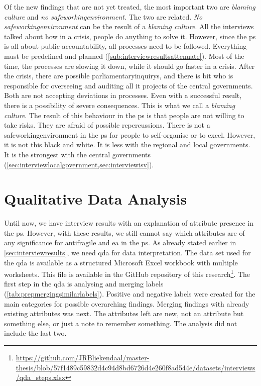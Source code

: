 Of the new findings that are not yet treated, the most important two are \textit{blaming culture} and \textit{no \gls{safeworkingenvironment}}. The two are related. \textit{No \gls{safeworkingenvironment}} can be the result of a \textit{blaming culture}. All the interviews talked about how in a crisis, people do anything to solve it. However, since the \gls{ps} is all about public accountability, all processes need to be followed. Everything must be predefined and planned (\cref{sub:interviewresultsattenuate}). Most of the time, the processes are slowing it down, while it should go faster in a crisis. After the crisis, there are possible \glspl{parliamentaryinquiry}, and there is \acrshort{bit} who is responsible for overseeing and auditing all \acrshort{it} projects of the central governments. Both are not accepting deviations in processes. Even with a successful result, there is a possibility of severe consequences. This is what we call a \textit{blaming culture}. The result of this behaviour in the \gls{ps} is that people are not willing to take risks. They are afraid of possible repercussions. There is not a \gls{safeworkingenvironment} in the \gls{ps} for people to self-organise or to excel. However, it is not this black and white. It is less with the regional and local governments. It is the strongest with the central governments (\cref{sec:interviewlocalgovernment,sec:interviewisv}).
\section{Qualitative Data Analysis}
\label{sec:dataprep}
Until now, we have interview results with an explanation of attribute presence in the \gls{ps}. However, with these results, we still cannot say which attributes are of any significance for \gls{antifragile} and \acrshort{ea} in the \gls{ps}. As already stated earlier in \cref{sec:interviewresults}, we need \acrshort{qda} for data interpretation. The data set used for the \acrshort{qda} is available as a structured Microsoft Excel workbook with multiple worksheets. This file is available in the GitHub repository of this research\footnote{\url{https://github.com/JRBliekendaal/master-thesis/blob/57f1489c59832d4c94d8bd6726d4e260f8ad544e/datasets/interviews/qda_steps.xlsx}}. The first step in the \acrshort{qda} is analysing and merging labels (\cref{tab:prepmergingsimilarlabels}). Positive and negative labels were created for the main categories for possible overarching findings. Merging findings with already existing \glspl{attribute} was next. The \glspl{attribute} left are new, not an \gls{attribute} but something else, or just a note to remember something. The analysis did not include the last two. 

